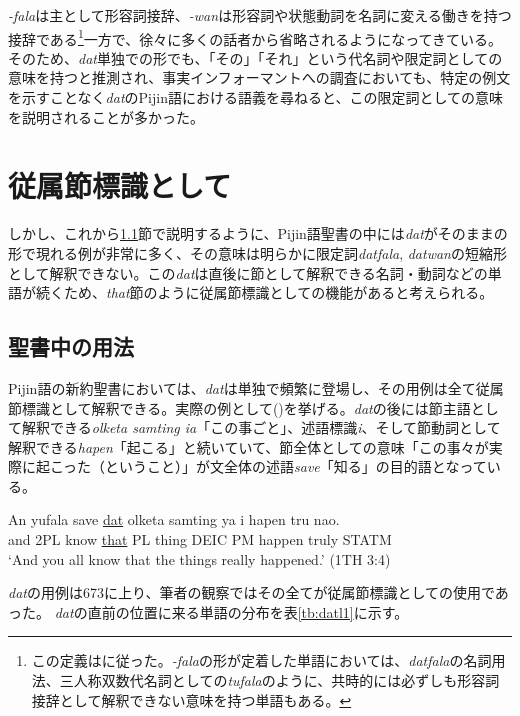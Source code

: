 \textit{-fala}は主として形容詞接辞、\textit{-wan}は形容詞や状態動詞を名詞に変える働きを持つ接辞である\footnote{
この定義は\cite{syntax}に従った。\textit{-fala}の形が定着した単語においては、\textit{datfala}の名詞用法、三人称双数代名詞としての\textit{tufala}のように、共時的には必ずしも形容詞接辞として解釈できない意味を持つ単語もある。}一方で、徐々に多くの話者から省略されるようになってきている\citep{syntax}。
そのため、\textit{dat}単独での形でも、「その」「それ」という代名詞や限定詞としての意味を持つと推測され、事実インフォーマントへの調査においても、特定の例文を示すことなく\textit{dat}のPijin語における語義を尋ねると、この限定詞としての意味を説明されることが多かった。

\section{従属節標識として}

しかし、これから\ref{sec:datbib}節で説明するように、Pijin語聖書の中には\textit{dat}がそのままの形で現れる例が非常に多く、その意味は明らかに限定詞\textit{datfala}, \textit{datwan}の短縮形として解釈できない。この\textit{dat}は直後に節として解釈できる名詞・動詞などの単語が続くため、\textit{that}節のように従属節標識としての機能があると考えられる。

\subsection{聖書中の用法}\label{sec:datbib}
Pijin語の新約聖書においては、\textit{dat}は単独で頻繁に登場し、その用例は全て従属節標識として解釈できる。実際の例として()を挙げる。\textit{dat}の後には節主語として解釈できる\textit{olketa samting ia}「この事ごと」、述語標識\textit{i}、そして節動詞として解釈できる\textit{hapen}「起こる」と続いていて、節全体としての意味「この事々が実際に起こった（ということ）」が文全体の述語\textit{save}「知る」の目的語となっている。

\begin{exe}
\ex
\gll An yufala save \underline{dat} olketa samting ya i hapen tru nao.\\
and 2PL know \underline{that} PL thing DEIC PM happen truly STATM\\
\glt `And you all know that the things really happened.' (1TH 3:4)
\end{exe}

\textit{dat}の用例は673に上り、筆者の観察ではその全てが従属節標識としての使用であった。
\textit{dat}の直前の位置に来る単語の分布を表\ref{tb:datl1}に示す。

